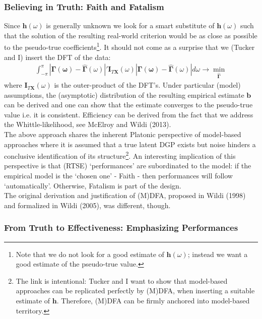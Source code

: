 \documentclass[11pt]{article}
\begin{document}
\subsubsection{Believing in Truth: Faith and Fatalism}

Since $\mathbf{h}(\omega)$ is generally unknown we look for a smart substitute of $\mathbf{h}(\omega)$ such that the solution of the resulting real-world criterion would be as close as possible to the pseudo-true coefficients\footnote{Note that we do not look for a good estimate of $\mathbf{h}(\omega)$; instead we want a good estimate of the pseudo-true value.}. It should not come as a surprise that we (Tucker and I) insert the DFT of the data:
\begin{eqnarray*}
\int_{-\pi}^\pi |\mathbf{\Gamma(\omega)-\hat{\Gamma}}(\omega)|' \mathbf{I}_{T\mathbf{X}}(\omega) |\mathbf{\Gamma(\omega)-\hat{\Gamma}}(\omega)|d\omega \to\min_{\mathbf{\hat{\Gamma}}}
\end{eqnarray*}
where $\mathbf{I}_{T\mathbf{X}}(\omega)$ is the outer-product of the DFT's. Under particular (model) assumptions, the (asymptotic) distribution of the resulting empirical estimate $\mathbf{b}$ can be derived and one can show that the estimate converges to the pseudo-true value i.e. it is consistent. Efficiency can be derived from the fact that we address the Whittle-likelihood,  see McElroy and Wildi (2013).\\

The above approach shares the inherent Platonic perspective of model-based approaches where it is assumed that a true latent DGP exists but noise hinders a conclusive identification of its structure\footnote{ The  link is intentional: Tucker and I want to show that model-based approaches can be replicated perfectly by (M)DFA, when inserting a suitable estimate of $\mathbf{h}$. Therefore, (M)DFA can be firmly anchored into model-based territory.}. An interesting implication of this perspective is that (RTSE) `performances'  are subordinated to the model: if the empirical model is the `chosen one'  - Faith - then performances will follow `automatically'. Otherwise, Fatalism is part of the design.\\

The original derivation and justification of (M)DFA, proposed in Wildi (1998) and formalized in Wildi (2005), was different, though.\\





\subsubsection{From Truth to Effectiveness: Emphasizing Performances}
\end{document}
